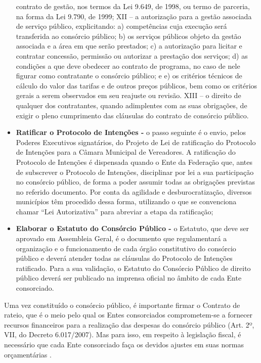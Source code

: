 \begin{itemize}
	contrato de gestão, nos termos da Lei 9.649, de 1998, ou
	termo de parceria, na forma da Lei 9.790, de 1999;
	\subitem XII – a autorização para a gestão associada de serviço público, explicitando: a) competências cuja execução será transferida ao
	consórcio público;
	b) os serviços públicos objeto da gestão associada
	e a área em que serão prestados;
	c) a autorização para licitar e contratar concessão,
	permissão ou autorizar a prestação dos serviços;
	d) as condições a que deve obedecer ao contrato
	de programa, no caso de nele figurar como contratante o consórcio público; e
	e) os critérios técnicos de cálculo do valor das tarifas e de outros preços públicos, bem como os critérios gerais a serem observados em seu reajuste
	ou revisão.
	\subitem XIII – o direito de qualquer dos contratantes, quando adimplentes com as suas obrigações, de exigir o pleno cumprimento das cláusulas do contrato de consórcio público.
	
	\item \textbf{Ratificar o Protocolo de Intenções -} o passo seguinte é o envio, pelos Poderes Executivos signatários, do Projeto de Lei de ratificação do Protocolo de Intenções para a Câmara Municipal de Vereadores. A ratificação do Protocolo de Intenções é dispensada quando o Ente da Federação que, antes de subscrever o Protocolo de Intenções, disciplinar por lei a sua participação no consórcio público, de forma a poder assumir todas as obrigações previstas no referido	documento. Por conta da agilidade e desburocratização, diversos municípios têm procedido dessa forma, utilizando o que se convenciona chamar “Lei Autorizativa” para abreviar a etapa da ratificação;
	
	\item \textbf{Elaborar o Estatuto do Consórcio Público -} o Estatuto, que deve ser aprovado em Assembleia Geral, é o documento que regulamentará a organização e o funcionamento de cada órgão constitutivo do consórcio público e deverá atender todas as cláusulas do Protocolo de Intenções ratificado. Para a sua validação, o Estatuto do Consórcio Público de direito público deverá ser publicado na imprensa oficial no	âmbito de cada Ente consorciado.
\end{itemize}

Uma vez constituído o consórcio público, é importante firmar o Contrato de rateio, que é o meio pelo qual os Entes consorciados comprometem-se a fornecer recursos financeiros para a realização das despesas do consórcio público (Art. 2º, VII, do Decreto 6.017/2007). Mas para isso, em respeito à legislação fiscal, é necessário que cada Ente consorciado faça os devidos ajustes em suas normas orçamentárias \cite{consorcio_publico}.

